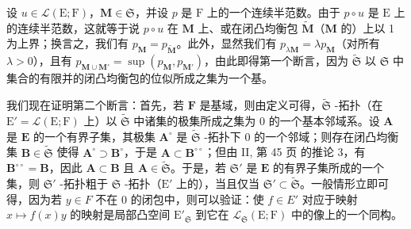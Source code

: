 设 \(u \in \mathcal{L}(\mathrm{E};\mathrm{F})\)，\(\mathbf{M} \in \mathfrak{S}\)，并设 \(p\) 是 \(\mathrm{F}\) 上的一个连续半范数。由于 \(p \circ u\) 是 \(\mathrm{E}\) 上的连续半范数，这就等于说 \(p \circ u\) 在 \(\mathbf{M}\) 上、或在闭凸均衡包 \(\tilde{\mathbf{M}}\)（\(\mathbf{M}\) 的）上以 1 为上界；换言之，我们有 \(p_{\mathbf{M}} = p_{\tilde{\mathbf{M}}}\)。此外，显然我们有 \(p_{\lambda \mathbf{M}} = \lambda p_{\mathbf{M}}\)（对所有 \(\lambda > 0\)），且有 \(p_{\mathbf{M} \cup \mathbf{M}'} = \sup(p_{\mathbf{M}}, p_{\mathbf{M}'})\)，由此即得第一个断言，因为 \(\tilde{\mathfrak{S}}\) 以 \(\mathfrak{S}\) 中集合的有限并的闭凸均衡包的位似所成之集为一个基。

我们现在证明第二个断言：首先，若 \(\mathbf{F}\) 是基域，则由定义可得，\(\tilde{\mathfrak{S}}\) -拓扑（在 \(\mathrm{E}' = \mathcal{L}(\mathrm{E};\mathrm{F})\) 上）以 \(\tilde{\mathfrak{S}}\) 中诸集的极集所成之集为 0 的一个基本邻域系。设 \(\mathbf{A}\) 是 \(\mathbf{E}\) 的一个有界子集，其极集 \(\mathbf{A}^{\circ}\) 是 \(\tilde{\mathfrak{S}}\) -拓扑下 0 的一个邻域；则存在闭凸均衡集 \(\mathbf{B} \in \tilde{\mathfrak{S}}\) 使得 \(\mathbf{A}^{\circ} \supset \mathbf{B}^{\circ}\)，于是 \(\mathbf{A} \subset \mathbf{B}^{\circ \circ}\)；但由 II, 第 45 页 的推论 3，有 \(\mathbf{B}^{\circ \circ} = \mathbf{B}\)，因此 \(\mathbf{A} \subset \mathbf{B}\) 且 \(\mathbf{A} \in \tilde{\mathfrak{S}}\)。于是，若 \(\mathfrak{S}'\) 是 \(\mathbf{E}\) 的有界子集所成的一个集，则 \(\mathfrak{S}'\) -拓扑粗于 \(\mathfrak{S}\) -拓扑（\(\mathrm{E}'\) 上的），当且仅当 \(\mathfrak{S}' \subset \tilde{\mathfrak{S}}\)。一般情形立即可得，因为若 \(y \in F\) 不在 0 的闭包中，则可以验证：使 \(f \in E'\) 对应于映射 \(x \mapsto f(x)y\) 的映射是局部凸空间 \(\mathrm{E}'_{\mathfrak{S}}\) 到它在 \(\mathcal{L}_{\mathfrak{S}}(\mathrm{E};\mathrm{F})\) 中的像上的一个同构。

